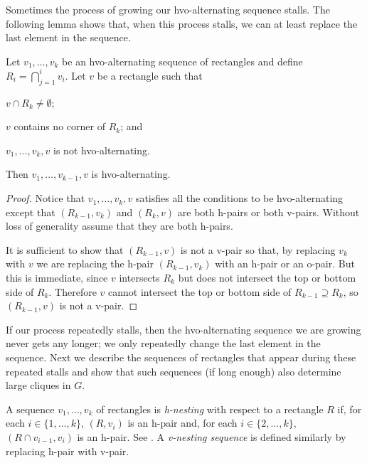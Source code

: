 \documentclass[lotsofwhite]{patmorin}
\begin{document}
Sometimes the process of growing our hvo-alternating sequence stalls. The
following lemma shows that, when this process stalls, we can at least
replace the last element in the sequence.

\begin{lem}
  Let $v_1,\ldots,v_k$ be an hvo-alternating sequence of rectangles and
  define $R_i=\bigcap_{j=1}^i v_i$. Let $v$ be a rectangle such
  that 
  \begin{compactenum}
     \item $v\cap R_k\ne \emptyset$; 
     \item $v$ contains no corner of $R_k$; and 
     \item $v_1,\ldots,v_k,v$ is not hvo-alternating.
  \end{compactenum}
  Then $v_1,\ldots,v_{k-1},v$ is hvo-alternating.
\end{lem}

\begin{proof}
  Notice that $v_1,\ldots,v_k,v$ satisfies all the conditions to be
  hvo-alternating except that $(R_{k-1},v_k)$ and $(R_k,v)$
  are both h-pairs or both v-pairs.  Without loss of generality assume
  that they are both h-pairs.

  It is sufficient to show that $(R_{k-1},v)$ is not a v-pair so that,
  by replacing $v_k$ with $v$ we are replacing the h-pair $(R_{k-1},v_k)$
  with an h-pair or an o-pair.  But this is immediate, since
  $v$ intersects $R_k$ but does not intersect the top or bottom side
  of $R_k$.  Therefore $v$ cannot intersect the top or bottom side of
  $R_{k-1}\supseteq R_k$, so $(R_{k-1},v)$ is not a v-pair.
\end{proof}

If our process repeatedly stalls, then the hvo-alternating sequence we
are growing never gets any longer; we only repeatedly change the last
element in the sequence. Next we describe the sequences of rectangles
that appear during these repeated stalls and show that such sequences
(if long enough) also determine large cliques in $G$.

A sequence $v_1,\ldots,v_k$ of rectangles is \emph{h-nesting} with
respect to a rectangle $R$ if, for each $i\in\{1,\ldots,k\}$, $(R,v_i)$
is an h-pair and, for each $i\in\{2,\ldots,k\}$, $(R\cap v_{i-1},v_i)$
is an h-pair.  See .  A \emph{v-nesting sequence} is
defined similarly by replacing h-pair with v-pair.
\end{document}
